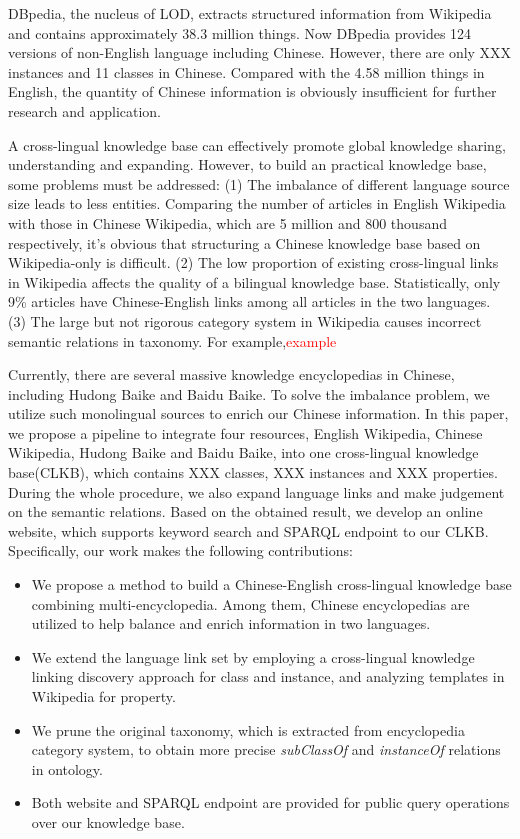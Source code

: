 \documentclass[runningheads,a4paper]{llncs}
\begin{document}
DBpedia, the nucleus of LOD, extracts structured information from Wikipedia and contains approximately 38.3 million things. Now DBpedia provides 124 versions of non-English language including Chinese. However, there are only XXX instances and 11 classes in Chinese. Compared with the 4.58 million things in English, the quantity of Chinese information is obviously insufficient for further research and application.

A cross-lingual knowledge base can effectively promote global knowledge sharing, understanding and expanding. However, to build an practical knowledge base, some problems must be addressed: (1) The imbalance of different language source size leads to less entities. Comparing the number of articles in English Wikipedia with those in Chinese Wikipedia, which are 5 million and 800 thousand respectively, it's obvious that structuring a Chinese knowledge base based on Wikipedia-only is difficult. (2) The low proportion of existing cross-lingual links in Wikipedia affects the quality of a bilingual knowledge base. Statistically, only 9\% articles have Chinese-English links among all articles in the two languages. (3) The large but not rigorous category system in Wikipedia causes incorrect semantic relations in taxonomy. For example,\textcolor{red}{example}



Currently, there are several massive knowledge encyclopedias in Chinese, including Hudong Baike and Baidu Baike. To solve the imbalance problem, we utilize such monolingual sources to enrich our Chinese information. In this paper, we propose a pipeline to integrate four resources, English Wikipedia, Chinese Wikipedia, Hudong Baike and Baidu Baike, into one cross-lingual knowledge base(CLKB), which contains XXX classes, XXX instances and XXX properties. During the whole procedure, we also expand language links and make judgement on the semantic relations. Based on the obtained result, we develop an online website, which supports keyword search and SPARQL endpoint to our CLKB. Specifically, our work makes the following contributions:
\begin{itemize}
  \item We propose a method to build a Chinese-English cross-lingual knowledge base combining multi-encyclopedia. Among them, Chinese encyclopedias are utilized to help balance and enrich information in two languages.
  \item We extend the language link set by employing a cross-lingual knowledge linking discovery approach for class and instance, and analyzing templates in Wikipedia for property.
  \item We prune the original taxonomy, which is extracted from encyclopedia category system, to obtain more precise \textit{subClassOf} and \textit{instanceOf} relations in ontology.
  \item Both website and SPARQL endpoint are provided for public query operations over our knowledge base.
\end{itemize}
\end{document}
